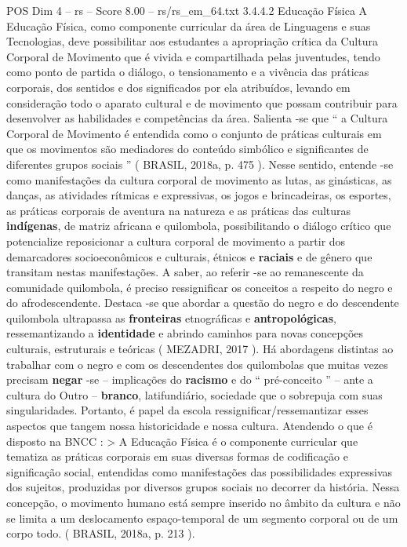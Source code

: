 \begin{textsample}{POS Dim 4 – rs – Score 8.00 – rs/rs\_em\_64.txt}  \label{ex:f4_pos_096}
3.4.4.2 Educação Física A Educação Física, como componente curricular da área de Linguagens e suas Tecnologias, deve possibilitar aos estudantes a apropriação crítica da Cultura Corporal de Movimento que é vivida e compartilhada pelas juventudes, tendo como ponto de partida o diálogo, o tensionamento e a vivência das práticas corporais, dos sentidos e dos significados por ela atribuídos, levando em consideração todo o aparato cultural e de movimento que possam contribuir para desenvolver as habilidades e competências da área.
Salienta -se que “ a Cultura Corporal de Movimento é entendida como o conjunto de práticas culturais em que os movimentos são mediadores do conteúdo simbólico e significantes de diferentes grupos sociais ” ( BRASIL, 2018a, p. 475 ).
Nesse sentido, entende -se como manifestações da cultura corporal de movimento as lutas, as ginásticas, as danças, as atividades rítmicas e expressivas, os jogos e brincadeiras, os esportes, as práticas corporais de aventura na natureza e as práticas das culturas \textbf{indígenas}, de matriz africana e quilombola, possibilitando o diálogo crítico que potencialize reposicionar a cultura corporal de movimento a partir dos demarcadores socioeconômicos e culturais, étnicos e \textbf{raciais} e de gênero que transitam nestas manifestações.
A saber, ao referir -se ao remanescente da comunidade quilombola, é preciso ressignificar os conceitos a respeito do negro e do afrodescendente.
Destaca -se que abordar a questão do negro e do descendente quilombola ultrapassa as \textbf{fronteiras} etnográficas e \textbf{antropológicas}, ressemantizando a \textbf{identidade} e abrindo caminhos para novas concepções culturais, estruturais e teóricas ( MEZADRI, 2017 ).
Há abordagens distintas ao trabalhar com o negro e com os descendentes dos quilombolas que muitas vezes precisam \textbf{negar} -se – implicações do \textbf{racismo} e do “ pré-conceito ” – ante a cultura do Outro – \textbf{branco}, latifundiário, sociedade que o sobrepuja com suas singularidades.
Portanto, é papel da escola ressignificar/ressemantizar esses aspectos que tangem nossa historicidade e nossa cultura.
Atendendo o que é disposto na BNCC : > A Educação Física é o componente curricular que tematiza as práticas corporais em suas diversas formas de codificação e significação social, entendidas como manifestações das possibilidades expressivas dos sujeitos, produzidas por diversos grupos sociais no decorrer da história.
Nessa concepção, o movimento humano está sempre inserido no âmbito da cultura e não se limita a um deslocamento espaço-temporal de um segmento corporal ou de um corpo todo. ( BRASIL, 2018a, p. 213 ).

\end{textsample}
